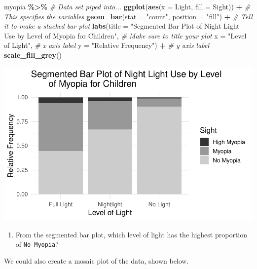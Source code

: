 \documentclass[
]{report}
\newenvironment{Shaded}{\begin{snugshade}}{\end{snugshade}}
\newcommand{\AttributeTok}[1]{\textcolor[rgb]{0.13,0.29,0.53}{#1}}
\newcommand{\CommentTok}[1]{\textcolor[rgb]{0.56,0.35,0.01}{\textit{#1}}}
\newcommand{\FunctionTok}[1]{\textcolor[rgb]{0.13,0.29,0.53}{\textbf{#1}}}
\newcommand{\NormalTok}[1]{#1}
\newcommand{\SpecialCharTok}[1]{\textcolor[rgb]{0.81,0.36,0.00}{\textbf{#1}}}
\newcommand{\StringTok}[1]{\textcolor[rgb]{0.31,0.60,0.02}{#1}}
\providecommand{\tightlist}{%
  \setlength{\itemsep}{0pt}\setlength{\parskip}{0pt}}
\begin{document}
\begin{Shaded}
\begin{Highlighting}[]
\NormalTok{myopia }\SpecialCharTok{\%\textgreater{}\%} \CommentTok{\# Data set piped into...}
\FunctionTok{ggplot}\NormalTok{(}\FunctionTok{aes}\NormalTok{(}\AttributeTok{x =}\NormalTok{ Light, }\AttributeTok{fill =}\NormalTok{ Sight)) }\SpecialCharTok{+}   \CommentTok{\# This specifies the variables}
  \FunctionTok{geom\_bar}\NormalTok{(}\AttributeTok{stat =} \StringTok{"count"}\NormalTok{, }\AttributeTok{position =} \StringTok{"fill"}\NormalTok{) }\SpecialCharTok{+}  \CommentTok{\# Tell it to make a stacked bar plot}
  \FunctionTok{labs}\NormalTok{(}\AttributeTok{title =} \StringTok{"Segmented Bar Plot of Night Light Use by Level }
\StringTok{       of Myopia for Children"}\NormalTok{,  }\CommentTok{\# Make sure to title your plot }
       \AttributeTok{x =} \StringTok{"Level of Light"}\NormalTok{,   }\CommentTok{\# x axis label}
       \AttributeTok{y =} \StringTok{"Relative Frequency"}\NormalTok{) }\SpecialCharTok{+} \CommentTok{\# y axis label}
    \FunctionTok{scale\_fill\_grey}\NormalTok{()}
\end{Highlighting}
\end{Shaded}

\begin{center}\includegraphics[width=0.6\linewidth]{03-OCA02-EDA_files/figure-latex/unnamed-chunk-8-1} \end{center}

\begin{enumerate}
\def\labelenumi{\arabic{enumi}.}
\setcounter{enumi}{9}
\tightlist
\item
  From the segmented bar plot, which level of light has the highest proportion of \texttt{No\ Myopia}?
\end{enumerate}

\vspace{0.5in}

\newpage

We could also create a mosaic plot of the data, shown below.
\end{document}
